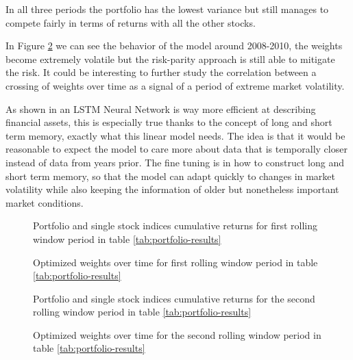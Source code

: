 In all three periods the portfolio has the lowest variance but still manages to compete fairly in terms of returns with all the other stocks. 

In Figure \ref{fig:portfolio-weights-A} we can see the behavior of the model around 2008-2010, the weights become extremely volatile but the risk-parity approach is still able to mitigate the risk. It could be interesting to further study the correlation between a crossing of weights over time as a signal of a period of extreme market volatility.

As shown in \cite{nakagawa} an LSTM Neural Network is way more efficient at describing financial assets, this is especially true thanks to the concept of long and short term memory, exactly what this linear model needs. The idea is that it would be reasonable to expect the model to care more about data that is temporally closer instead of data from years prior. The fine tuning is in how to construct long and short term memory, so that the model can adapt quickly to changes in market volatility while also keeping the information of older but nonetheless important market conditions.
\begin{figure}[H]
	\centering
	
	\caption{Portfolio and single stock indices cumulative returns for first rolling window period in table \ref{tab:portfolio-results}}
	\label{fig:portfolio-returns-A}
\end{figure}

\begin{figure}[H]
	\centering
	
	\caption{Optimized weights over time for first rolling window period in table \ref{tab:portfolio-results}}
	\label{fig:portfolio-weights-A}
\end{figure}


\begin{figure}[H]
	\centering
	
	\caption{Portfolio and single stock indices cumulative returns for the second rolling window period in table \ref{tab:portfolio-results}}
	\label{fig:portfolio-returns-B}
\end{figure}

\begin{figure}[H]
	\centering
	
	\caption{Optimized weights over time for the second rolling window period in table \ref{tab:portfolio-results}}
	\label{fig:portfolio-weights-B}
\end{figure}







